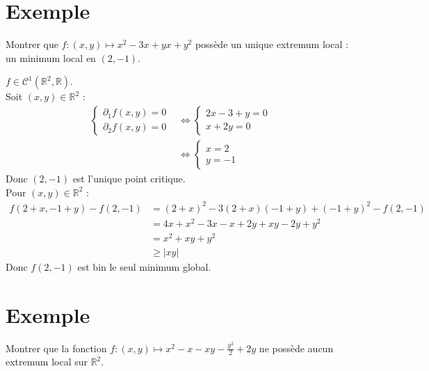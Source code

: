 \documentclass[../main.tex]{subfiles}
\begin{document}
\section{Exemple}
\begin{tcolorbox}[title=Exemple 36.52, title filled=false, colframe=darkgreen, colback=darkgreen!10!white]
    Montrer que $f:(x, y) \mapsto x^2-3 x+y x+y^2$ possède un unique extremum local : un minimum local en $(2,-1)$.
\end{tcolorbox}

\noindent $f\in \mathcal{C}^1(\mathbb{R}^2, \mathbb{R})$. \\
Soit $(x, y)\in \mathbb{R}^2$ : 
\begin{align*}
    \begin{cases}
        \partial_1 f(x, y) = 0 \\
        \partial_2 f(x, y) = 0
    \end{cases} &\Leftrightarrow \begin{cases}
        2x - 3 + y = 0 \\
        x + 2y = 0
    \end{cases} \\
    &\Leftrightarrow \begin{cases}
        x = 2 \\
        y = -1
    \end{cases}
\end{align*}
Donc $(2, -1)$ est l'unique point critique. \\
Pour $(x, y)\in \mathbb{R}^2$ : 
\begin{align*}
    f(2 + x, -1 + y) - f(2, -1) &= (2 + x)^2 - 3(2 + x)(-1 + y) + (-1 + y)^2 - f(2, -1) \\
    &= 4x + x^2 - 3x - x + 2y + xy - 2y + y^2 \\
    &= x^2 + xy + y^2 \\
    &\geq |xy|
\end{align*}
Donc $f(2, -1)$ est bin le seul minimum global. 

\section{Exemple}
\begin{tcolorbox}[title=Exemple 36.53, title filled=false, colframe=darkgreen, colback=darkgreen!10!white]
    Montrer que la fonction $f:(x, y) \mapsto x^2-x-x y-\frac{y^2}{2}+2 y$ ne possède aucun extremum local sur $\mathbb{R}^2$.
\end{tcolorbox}
\end{document}
